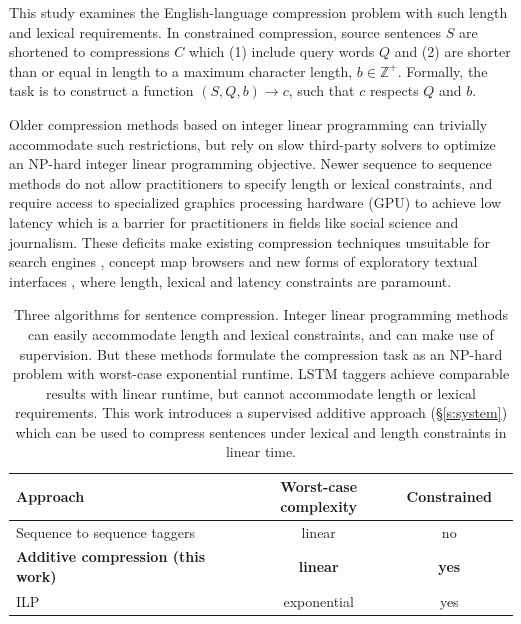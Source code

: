 \documentclass[11pt,a4paper]{article}
\begin{document}
This study examines the English-language compression problem with such length and lexical requirements. In constrained compression, source sentences $S$ are shortened to compressions $C$ which (1) include query words $Q$ and (2) are shorter than or equal in length to a maximum character length, $b \in \mathbb{Z}^{+}$. Formally, the task is to construct a function $(S,Q,b) \rightarrow c$, such that $c$ respects $Q$ and $b$.

Older compression methods  \cite{clarke2008global,filippova2013overcoming} based on integer linear programming can trivially accommodate such restrictions, but rely on slow third-party solvers to optimize an NP-hard integer linear programming objective\label{s:relatedwork}. Newer sequence to sequence methods \cite{filippova2015sentence} do not allow practitioners to specify length or lexical constraints, and require access to specialized graphics processing hardware (GPU) to achieve low latency which is a barrier for practitioners in fields like social science and journalism. These deficits make existing compression techniques unsuitable for search engines \cite{hearst2009search}, concept map browsers \cite{falke2017graphdocexplore} and new forms of exploratory textual interfaces \cite{marchionini2006exploratory}, where length, lexical and latency constraints are paramount. 

\begin{table}[htb!]
\begin{tabular}{lccc}
\textbf{Approach} & \textbf{Worst-case complexity} & \textbf{Constrained}  \\ \hline
Sequence to sequence taggers \cite{filippova2015sentence}   & linear              & no         \\   
\textbf{Additive compression (this work)}  & \textbf{linear}     &      \textbf{yes}   \\
ILP    \cite{filippova2013overcoming,Wang2017CanSH}       &   exponential    & yes      \\
\end{tabular}
\caption{Three algorithms for sentence compression. Integer linear programming methods \cite{clarke2008global,filippova2013overcoming,Wang2017CanSH} can easily accommodate length and lexical constraints, and can make use of supervision. But these methods formulate the compression task as an NP-hard problem with worst-case exponential runtime. LSTM taggers \cite{filippova2015sentence} achieve comparable results with linear runtime, but cannot accommodate length or lexical requirements. This work introduces a supervised additive approach (\S\ref{s:system}) which can be used to compress sentences under lexical and length constraints in linear time.} 
\label{t:algos}
\end{table}
\end{document}
